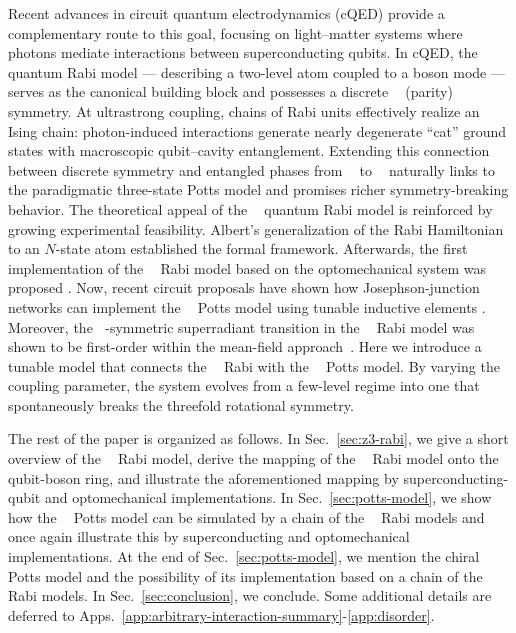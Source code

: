 \documentclass[reprint, aps, prx, amsmath, amssymb, longbibliography, superscriptaddress]{revtex4-2}
\DeclareMathOperator{\Zthree}{\mathbb{Z}_3}
\DeclareMathOperator{\Ztwo}{\mathbb{Z}_2}
\begin{document}
Recent advances in circuit quantum electrodynamics (cQED) provide a complementary route to this goal, focusing on light–matter systems where photons mediate interactions between superconducting qubits\cite{kurpiers_deterministic_2018,vanloo_photonmediated_2013,astafiev_resonance_2010}. In cQED, the quantum Rabi model \cite{braumuller_analog_2017, braak_integrability_2011,hwang_quantum_2015, chen_shortcuts_2021} --- describing a two-level atom coupled to a boson mode --- serves as the canonical building block and possesses a discrete $\Ztwo $ (parity) symmetry. At ultrastrong coupling, chains of Rabi units effectively realize an Ising chain\cite{hwang_largescale_2013}: photon-induced interactions generate nearly degenerate “cat” ground states with macroscopic qubit–cavity entanglement. Extending this connection between discrete symmetry and entangled phases from $\Ztwo$ to $\Zthree$ \cite{albert_quantum_2012, zhang_z_n_2014, sedov_chiral_2020, kozin_quantum_2024} naturally links to the paradigmatic three-state Potts model and promises richer symmetry-breaking behavior.
The theoretical appeal of the $\Zthree$ quantum Rabi model is reinforced by growing experimental feasibility. Albert’s generalization of the Rabi Hamiltonian to an $N$-state atom  \cite{albert_quantum_2012} established the formal framework. Afterwards, the first implementation of the $\Zthree$ Rabi model based on the optomechanical system was proposed \cite{sedov_chiral_2020}. Now, recent circuit proposals have shown how Josephson-junction networks can implement the $\Zthree$ Potts model using tunable inductive elements \cite{wauters_engineering_2024}. Moreover, the $\Zthree$-symmetric superradiant transition in the $\Zthree$ Rabi model was shown to be first-order within the mean-field approach~\cite{sedov_chiral_2020}.  Here we introduce a tunable model that connects the $\Zthree$ Rabi with the $\Zthree$ Potts model. By varying the coupling parameter, the system evolves from a few-level regime into one that spontaneously breaks the threefold rotational symmetry. 

The rest of the paper is organized as follows. In Sec.~\ref{sec:z3-rabi}, we give a short overview of the $\Zthree$ Rabi model, derive the mapping of the $\Zthree$ Rabi model onto the qubit-boson ring, and illustrate the aforementioned mapping by superconducting-qubit and optomechanical implementations. In Sec.~\ref{sec:potts-model}, we show how the $\Zthree$ Potts model can be simulated by a chain of the $\Zthree$ Rabi models and once again illustrate this by superconducting and optomechanical implementations. At the end of Sec.~\ref{sec:potts-model}, we mention the chiral $\Zthree$ Potts model and the possibility of its implementation based on a chain of the $\Zthree$ Rabi models. In Sec.~\ref{sec:conclusion}, we conclude. Some additional details are deferred to Apps.~\ref{app:arbitrary-interaction-summary}-\ref{app:disorder}.
\end{document}
